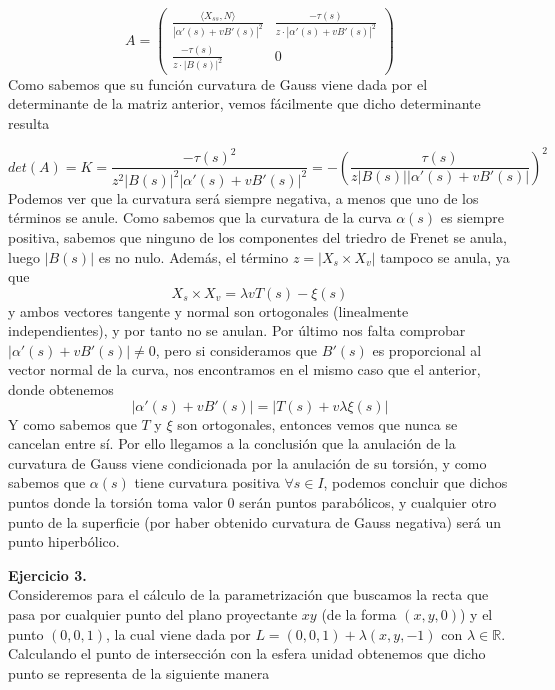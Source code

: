 \documentclass[fleqn]{article}
\def\R{\mathds{R}}
\begin{document}
    $$
    A=
    \begin{pmatrix}
        \frac{\langle X_{ss}, N \rangle}{|\alpha'(s) + vB'(s)|^2} & \frac{-\tau(s)}{z\cdot|\alpha'(s) + vB'(s)|^2} \\
        \frac{-\tau(s)}{z\cdot|B(s)|^2} & 0
    \end{pmatrix}
    $$
    Como sabemos que su función curvatura de Gauss viene dada por el determinante de la matriz anterior, vemos fácilmente que dicho determinante resulta
    
    $$det(A) = K = \frac{-\tau(s)^2}{z^2|B(s)|^2|\alpha'(s) + vB'(s)|^2} = - \left(\frac{\tau(s)}{z|B(s)||\alpha'(s) + vB'(s)|}\right)^2$$
    Podemos ver que la curvatura será siempre negativa, a menos que uno de los términos se anule. Como sabemos que la curvatura de la curva $\alpha(s)$ es siempre positiva,
    sabemos que ninguno de los componentes del triedro de Frenet se anula, luego $|B(s)|$ es no nulo. Además, el término $z = |X_s \times X_v|$ tampoco se anula, ya que
    $$X_s \times X_v = \lambda v T(s) - \xi(s)$$ 
    y ambos vectores tangente y normal son ortogonales (linealmente independientes), y por tanto no se anulan. Por último nos falta comprobar $|\alpha'(s) + vB'(s)|\neq 0$,
    pero si consideramos que $B'(s)$ es proporcional al vector normal de la curva, nos encontramos en el mismo caso que el anterior, donde obtenemos
    $$|\alpha'(s) + vB'(s)| = |T(s) + v\lambda \xi(s)|$$
    Y como sabemos que $T$ y $\xi$ son ortogonales, entonces vemos que nunca se cancelan entre sí. Por ello llegamos a la conclusión que la anulación de la curvatura de Gauss viene condicionada
    por la anulación de su torsión, y como sabemos que $\alpha(s)$ tiene curvatura positiva $\forall s \in I$, podemos concluir que dichos puntos donde la torsión toma valor 0 
    serán puntos parabólicos, y cualquier otro punto de la superficie (por haber obtenido curvatura de Gauss negativa) será un punto hiperbólico.

    \newpage


















    \textbf{Ejercicio 3. } \\

    Consideremos para el cálculo de la parametrización que buscamos la recta que pasa por cualquier punto del plano proyectante $xy$ (de la forma $(x,y,0)$) y el punto $(0,0,1)$,
    la cual viene dada por $L = (0,0,1) + \lambda (x,y,-1)$ con $\lambda \in \R$. Calculando el punto de intersección con la esfera unidad obtenemos que 
    dicho punto se representa de la siguiente manera
    
\end{document}
